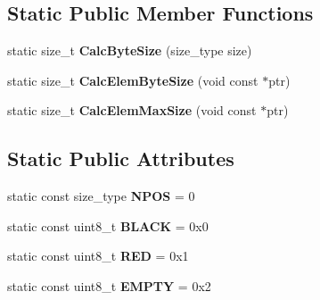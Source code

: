 \subsection*{Static Public Member Functions}
\begin{DoxyCompactItemize}
\item 
\hypertarget{classlsf_1_1container_1_1detail_1_1RBTreeState_ad237a9e370a77d97bd20e88b405fc4d9}{
static size\_\-t {\bfseries CalcByteSize} (size\_\-type size)}
\label{classlsf_1_1container_1_1detail_1_1RBTreeState_ad237a9e370a77d97bd20e88b405fc4d9}

\item 
\hypertarget{classlsf_1_1container_1_1detail_1_1RBTreeState_a26e2fde544ddd90da3c5b56d4d0d36df}{
static size\_\-t {\bfseries CalcElemByteSize} (void const $\ast$ptr)}
\label{classlsf_1_1container_1_1detail_1_1RBTreeState_a26e2fde544ddd90da3c5b56d4d0d36df}

\item 
\hypertarget{classlsf_1_1container_1_1detail_1_1RBTreeState_a3c101dae93f4af5f370729cf937be99e}{
static size\_\-t {\bfseries CalcElemMaxSize} (void const $\ast$ptr)}
\label{classlsf_1_1container_1_1detail_1_1RBTreeState_a3c101dae93f4af5f370729cf937be99e}

\end{DoxyCompactItemize}
\subsection*{Static Public Attributes}
\begin{DoxyCompactItemize}
\item 
\hypertarget{classlsf_1_1container_1_1detail_1_1RBTreeState_adc64c1ccade0d66f3714250cd73506f0}{
static const size\_\-type {\bfseries NPOS} = 0}
\label{classlsf_1_1container_1_1detail_1_1RBTreeState_adc64c1ccade0d66f3714250cd73506f0}

\item 
\hypertarget{classlsf_1_1container_1_1detail_1_1RBTreeState_af93e35f5e479b5ee98dfc59a4c5f7a12}{
static const uint8\_\-t {\bfseries BLACK} = 0x0}
\label{classlsf_1_1container_1_1detail_1_1RBTreeState_af93e35f5e479b5ee98dfc59a4c5f7a12}

\item 
\hypertarget{classlsf_1_1container_1_1detail_1_1RBTreeState_aec867615c5e0a1fc2ef4a4b1da0c2906}{
static const uint8\_\-t {\bfseries RED} = 0x1}
\label{classlsf_1_1container_1_1detail_1_1RBTreeState_aec867615c5e0a1fc2ef4a4b1da0c2906}

\item 
\hypertarget{classlsf_1_1container_1_1detail_1_1RBTreeState_ae46405456954a34c65a9becf26cf07db}{
static const uint8\_\-t {\bfseries EMPTY} = 0x2}
\label{classlsf_1_1container_1_1detail_1_1RBTreeState_ae46405456954a34c65a9becf26cf07db}

\end{DoxyCompactItemize}
